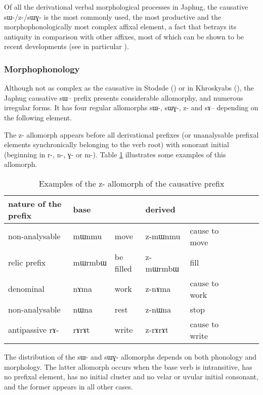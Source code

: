 \documentclass[oldfontcommands,oneside,a4paper,11pt]{article}
\newcommand{\ipa}[1]{{\phon \mbox{#1}}} %
\begin{document}
Of all the derivational verbal morphological processes in Japhug, the causative \ipa{sɯ-/z-/sɯɣ-} is the most commonly used, the most productive and the morphophonologically most complex affixal element, a fact that betrays its antiquity in comparison with other affixes, most of which can be shown to be recent developments (see in particular \citealt{jacques14antipassive}).

\subsubsection{Morphophonology} \label{subsub:caus:morphophon}
Although not as complex as the causative in Stodsde (\citealt{jackson07shangzhai}) or in Khroskyabs (\citealt{lai14caus}), the Japhug causative   \ipa{sɯ--} prefix presents  considerable allomorphy, and numerous irregular forms. It has four regular allomorphs \ipa{sɯ-}, \ipa{sɯɣ-}, \ipa{z-} and \ipa{sɤ--} depending on the following element.

The \ipa{z-} allomorph appears before all derivational prefixes (or unanalysable prefixal elements synchronically belonging to the verb root) with sonorant initial (beginning in \ipa{r-}, \ipa{n-}, \ipa{ɣ-} or \ipa{m-}). Table \ref{tab:causative.z} illustrates some examples of this allomorph.

\begin{table}[h]
\caption{Examples of the \ipa{z}- allomorph of the causative prefix}\label{tab:causative.z} \centering
\begin{tabular}{lllllllll} \toprule
nature of the prefix & base  & &derived  \\
\midrule
non-analysable &  \ipa{mɯnmu} &move& \ipa{z-mɯnmu} &cause to move\\
relic prefix &  \ipa{mɯrmbɯ} &be filled& \ipa{z-mɯrmbɯ} &fill\\
denominal &  \ipa{nɤma} &work& \ipa{z-nɤma} &cause to work\\
non-analysable &  \ipa{nɯna} &rest& \ipa{z-nɯna} &stop\\
antipassive \ipa{rɤ-} &  \ipa{rɤrɤt} &write& \ipa{z-rɤrɤt} &cause to write\\

\bottomrule
\end{tabular}
\end{table}


The distribution of the \ipa{sɯ-} and \ipa{sɯɣ-} allomorphs depends on both phonology and morphology. The   latter allomorph occurs when the base verb is intransitive, has no  prefixal element, has no initial cluster and no velar or uvular initial consonant, and the former appears in all other cases.
\end{document}
